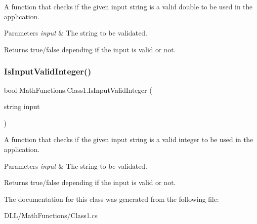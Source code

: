 A function that checks if the given input string is a valid double to be used in the application. 
\begin{DoxyParams}{Parameters}
{\em input} & The string to be validated. \\
\hline
\end{DoxyParams}
\begin{DoxyReturn}{Returns}
true/false depending if the input is valid or not. 
\end{DoxyReturn}
\mbox{\label{class_math_functions_1_1_class1_ab8c871446d8a8266122a1e393a902483}} 
\subsubsection{\texorpdfstring{Is\+Input\+Valid\+Integer()}{IsInputValidInteger()}}
{\footnotesize\ttfamily bool Math\+Functions.\+Class1.\+Is\+Input\+Valid\+Integer (\begin{DoxyParamCaption}\item[{string}]{input }\end{DoxyParamCaption})}

A function that checks if the given input string is a valid integer to be used in the application. 
\begin{DoxyParams}{Parameters}
{\em input} & The string to be validated. \\
\hline
\end{DoxyParams}
\begin{DoxyReturn}{Returns}
true/false depending if the input is valid or not. 
\end{DoxyReturn}


The documentation for this class was generated from the following file\+:\begin{DoxyCompactItemize}
\item 
D\+L\+L/\+Math\+Functions/Class1.\+cs\end{DoxyCompactItemize}
